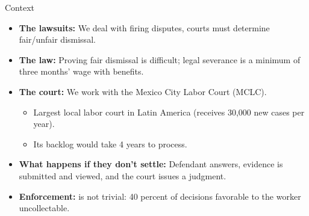 \documentclass[9pt]{beamer}
\begin{document}
\begin{frame}{Context}
   \begin{itemize}

       \item \textbf{The lawsuits:} We deal with firing disputes, courts must determine fair/unfair dismissal. 
       \vspace{0.05in}
         
        \item \textbf{The law:} Proving fair dismissal is difficult; legal severance is a minimum of three months' wage with benefits.  
        \vspace{0.05in}
         
        \item \textbf{The court:} We work with the Mexico City Labor Court (MCLC).
        \vspace{0.05in}
        \begin{itemize}
            \item Largest local labor court in Latin America (receives 30,000 new cases per year).
            \item Its backlog would take 4 years to process.
        \end{itemize}
                                
       
       \item \textbf{What happens if they don't settle:} Defendant answers, evidence is submitted and viewed, and the court issues a judgment.
       \vspace{0.05in}
       
       \item \textbf{Enforcement:} is not trivial: 40 percent of decisions favorable to the worker uncollectable. 
       
       \end{itemize}         
        
     \end{frame}
     
\end{document}

